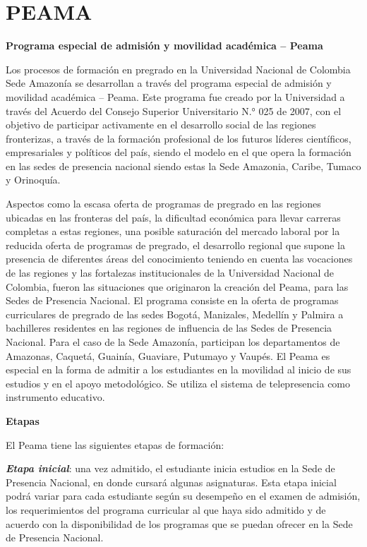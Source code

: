 \documentclass[
]{book}
\begin{document}
\hypertarget{peama}{%
\section*{PEAMA}\label{peama}}

\textbf{Programa especial de admisión y movilidad académica -- Peama}

Los procesos de formación en pregrado en la Universidad Nacional de Colombia Sede Amazonía se desarrollan a través del programa especial de admisión y movilidad académica -- Peama. Este programa fue creado por la Universidad a través del Acuerdo del Consejo Superior Universitario N.° 025 de 2007, con el objetivo de participar activamente en el desarrollo social de las regiones fronterizas, a través de la formación profesional de los futuros líderes científicos, empresariales y políticos del país, siendo el modelo en el que opera la formación en las sedes de presencia nacional siendo estas la Sede Amazonia, Caribe, Tumaco y Orinoquía.

Aspectos como la escasa oferta de programas de pregrado en las regiones ubicadas en las fronteras del país, la dificultad económica para llevar carreras completas a estas regiones, una posible saturación del mercado laboral por la reducida oferta de programas de pregrado, el desarrollo regional que supone la presencia de diferentes áreas del conocimiento teniendo en cuenta las vocaciones de las regiones y las fortalezas institucionales de la Universidad Nacional de Colombia, fueron las situaciones que originaron la creación del Peama, para las Sedes de Presencia Nacional. El programa consiste en la oferta de programas curriculares de pregrado de las sedes Bogotá, Manizales, Medellín y Palmira a bachilleres residentes en las regiones de influencia de las Sedes de Presencia Nacional. Para el caso de la Sede Amazonía, participan los departamentos de Amazonas, Caquetá, Guainía, Guaviare, Putumayo y Vaupés. El Peama es especial en la forma de admitir a los estudiantes en la movilidad al inicio de sus estudios y en el apoyo metodológico. Se utiliza el sistema de telepresencia como instrumento educativo.

\textbf{Etapas}

El Peama tiene las siguientes etapas de formación:

\emph{\textbf{Etapa inicial}}: una vez admitido, el estudiante inicia estudios en la Sede de Presencia Nacional, en donde cursará algunas asignaturas. Esta etapa inicial podrá variar para cada estudiante según su desempeño en el examen de admisión, los requerimientos del programa curricular al que haya sido admitido y de acuerdo con la disponibilidad de los programas que se puedan ofrecer en la Sede de Presencia Nacional.
\end{document}
